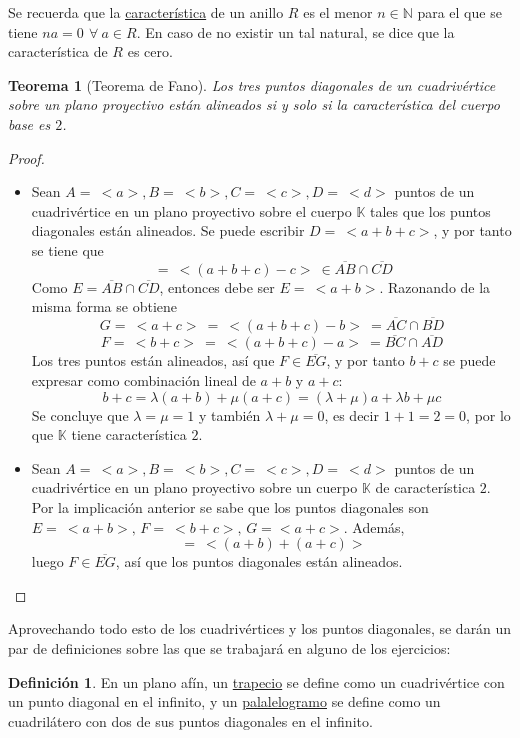 \documentclass[12pt]{report}
\newtheorem{theorem}{Teorema}[chapter]
\theoremstyle{definition}
\newtheorem{definition}{Definición}[chapter]
\theoremstyle{definition}
\theoremstyle{remark}
\newcommand{\N}{\mathbb N}
\begin{document}
Se recuerda que la \ul{característica} de un anillo $R$ es el menor $n \in \N$ para el que se tiene $na=0 \ \, \forall \ a \in R$. En caso de no existir un tal natural, se dice que la característica de $R$ es cero.

\begin{theorem}[Teorema de Fano]
Los tres puntos diagonales de un cuadrivértice sobre un plano proyectivo están alineados si y solo si la característica del cuerpo base es $2$.
\end{theorem}

\begin{proof}
\hfill
\begin{itemize}
    \item[{\fbox[rb]{$\Rightarrow$}}] Sean $A = \ <a>, B = \ <b>, C = \ <c>, D = \ <d>$ puntos de un cuadrivértice en un plano proyectivo sobre el cuerpo $\mathbb{K}$ tales que los puntos diagonales están alineados. Se puede escribir $D = \ <a+b+c>$, y por tanto se tiene que \[< a+b> \ = \ <(a+b+c)-c> \ \in \overline{AB} \cap \overline{CD}\] Como $E = \overline{AB} \cap \overline{CD}$, entonces debe ser $E = \ <a+b>$. Razonando de la misma forma se obtiene
    \[G = \ <a+c> \ = \ <(a+b+c)-b> \ = \overline{AC} \cap \overline{BD} \]
    \[F = \ <b+c> \ = \ <(a+b+c)-a> \ = \overline{BC} \cap \overline{AD} \]
    Los tres puntos están alineados, así que $F \in \overline{EG}$, y por tanto $b+c$ se puede expresar como combinación lineal de $a+b$ y $a+c$:
    \[b+c = \lambda(a+b)+\mu(a+c) = (\lambda+\mu)a+\lambda b + \mu c\]
    Se concluye que $\lambda = \mu = 1$ y también $\lambda + \mu = 0$, es decir $1+1 = 2 = 0$, por lo que $\mathbb{K}$ tiene característica $2$.
    \item[{\fbox[rb]{$\Leftarrow$}}] Sean $A = \ <a>, B = \ <b>, C = \ <c>, D = \ <d>$ puntos de un cuadrivértice en un plano proyectivo sobre un cuerpo $\mathbb{K}$ de característica $2$. Por la implicación anterior se sabe que los puntos diagonales son $E = \ <a+b>, \, F = \ <b+c>, \, G = <a+c>$. Además,
    \[<b+c> \ = \ <(a+b)+(a+c)> \]
    luego $F \in \overline{EG}$, así que los puntos diagonales están alineados.
\end{itemize}
\end{proof}

Aprovechando todo esto de los cuadrivértices y los puntos diagonales, se darán un par de definiciones sobre las que se trabajará en alguno de los ejercicios:

\begin{definition}
En un plano afín, un \ul{trapecio} se define como un cuadrivértice con un punto diagonal en el infinito, y un \ul{palalelogramo} se define como un cuadrilátero con dos de sus puntos diagonales en el infinito.
\end{definition}
\end{document}
